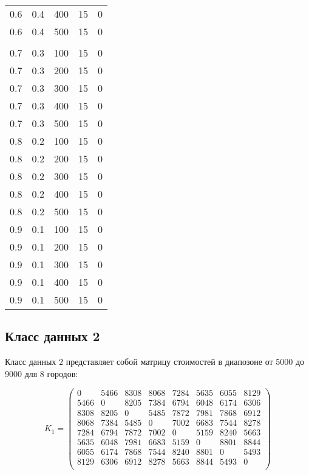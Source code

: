 \begin{center}
\begin{longtable}[c]{|c|c|c|c|c|}
 0.6 &  0.4 &  400 &    15 &     0 \\
 0.6 &  0.4 &  500 &    15 &     0 \\
\hline
\endfirsthead
\captionsetup{labelformat=continued, labelsep=quad}%
\caption{\space}\\
\endhead
 0.7 &  0.3 &  100 &    15 &     0 \\
 0.7 &  0.3 &  200 &    15 &     0 \\
 0.7 &  0.3 &  300 &    15 &     0 \\
 0.7 &  0.3 &  400 &    15 &     0 \\
 0.7 &  0.3 &  500 &    15 &     0 \\
\hline
 0.8 &  0.2 &  100 &    15 &     0 \\
 0.8 &  0.2 &  200 &    15 &     0 \\
 0.8 &  0.2 &  300 &    15 &     0 \\
 0.8 &  0.2 &  400 &    15 &     0 \\
 0.8 &  0.2 &  500 &    15 &     0 \\
\hline
 0.9 &  0.1 &  100 &    15 &     0 \\
 0.9 &  0.1 &  200 &    15 &     0 \\
 0.9 &  0.1 &  300 &    15 &     0 \\
 0.9 &  0.1 &  400 &    15 &     0 \\
 0.9 &  0.1 &  500 &    15 &     0 \\
\hline
\end{longtable}
\end{center}

\subsection{Класс данных 2}

Класс данных 2 представляет собой матрицу стоимостей в диапозоне от 5000 до 9000 для 8 городов:

\begin{equation}
    \label{eq:kd2}
	K_{1} = \begin{pmatrix}
		0 & 5466 & 8308 & 8068 & 7284 & 5635 & 6055 & 8129 \\
		5466 & 0 & 8205 & 7384 & 6794 & 6048 & 6174 & 6306 \\
		8308 & 8205 & 0 & 5485 & 7872 & 7981 & 7868 & 6912 \\
		8068 & 7384 & 5485 & 0 & 7002 & 6683 & 7544 & 8278 \\
		7284 & 6794 & 7872 & 7002 & 0 & 5159 & 8240 & 5663 \\
		5635 & 6048 & 7981 & 6683 & 5159 & 0 & 8801 & 8844 \\
		6055 & 6174 & 7868 & 7544 & 8240 & 8801 & 0 & 5493 \\
		8129 & 6306 & 6912 & 8278 & 5663 & 8844 & 5493 & 0 \\
	\end{pmatrix}
\end{equation}

